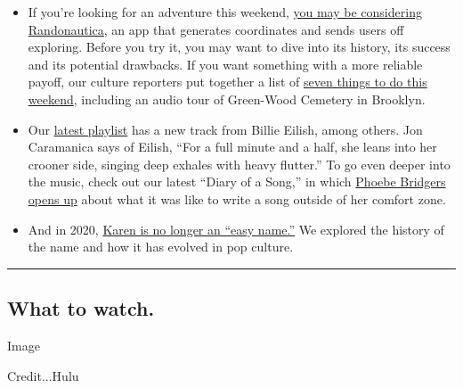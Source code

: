 \begin{itemize}
\item
  If you're looking for an adventure this weekend,
  \href{https://www.nytimes3xbfgragh.onion/2020/07/31/style/randonautica-app.html}{you
  may be considering Randonautica}, an app that generates coordinates
  and sends users off exploring. Before you try it, you may want to dive
  into its history, its success and its potential drawbacks. If you want
  something with a more reliable payoff, our culture reporters put
  together a list of
  \href{https://www.nytimes3xbfgragh.onion/2020/07/30/arts/things-to-do-weekend-coronavirus.html}{seven
  things to do this weekend}, including an audio tour of Green-Wood
  Cemetery in Brooklyn.
\item
  Our
  \href{https://www.nytimes3xbfgragh.onion/2020/07/31/arts/music/playlist-billie-eilish-snakehips-a-boogie.html}{latest
  playlist} has a new track from Billie Eilish, among others. Jon
  Caramanica says of Eilish, ``For a full minute and a half, she leans
  into her crooner side, singing deep exhales with heavy flutter.'' To
  go even deeper into the music, check out our latest ``Diary of a
  Song,'' in which
  \href{https://www.nytimes3xbfgragh.onion/2020/07/30/arts/music/phoebe-bridgers-kyoto.html}{Phoebe
  Bridgers opens up} about what it was like to write a song outside of
  her comfort zone.
\item
  And in 2020,
  \href{https://www.nytimes3xbfgragh.onion/2020/07/31/style/karen-name-meme-history.html}{Karen
  is no longer an ``easy name.''} We explored the history of the name
  and how it has evolved in pop culture.
\end{itemize}

\begin{center}\rule{0.5\linewidth}{\linethickness}\end{center}

\hypertarget{what-to-watch}{%
\subsection{What to watch.}\label{what-to-watch}}

Image

Credit...Hulu

